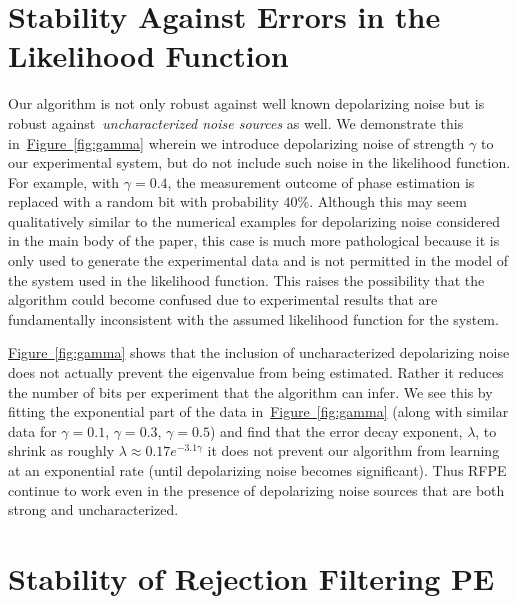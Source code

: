 \documentclass[aps,pra,amsmath,twocolumn,amssymb,superscriptaddress]{revtex4-1}
\newcommand{\fig}[1]{\hyperref[fig:#1]{Figure~\ref*{fig:#1}}}
\begin{document}
\section{Stability Against Errors in the Likelihood Function}


Our algorithm is not only robust against well known depolarizing noise but is robust against~\emph{uncharacterized noise sources} as well.  We demonstrate this in~\fig{gamma} wherein we introduce depolarizing noise of strength $\gamma$ to our experimental system, but do not include such noise in the likelihood function.  For example, with $\gamma=0.4$, the measurement outcome of phase estimation is replaced with a random bit with probability $40\%$.  Although this may seem qualitatively similar to the numerical examples for depolarizing noise considered in the main body of the paper, this case is much more pathological because it is only used to generate the experimental data and is not permitted in the model of the system used in the likelihood function.  This raises the possibility that the algorithm could become confused due to experimental results that are fundamentally inconsistent with the assumed likelihood function for the system.

\fig{gamma} shows that the inclusion of uncharacterized depolarizing noise does not actually prevent the eigenvalue from being estimated.  Rather it reduces the number of bits per experiment that the algorithm can infer.  We see this by fitting the exponential part of the data in~\fig{gamma} (along with similar data for $\gamma=0.1$, $\gamma=0.3$, $\gamma=0.5$) and find that the error decay exponent, $\lambda$, to shrink as roughly $\lambda \approx 0.17e^{-3.1\gamma}$ it does not prevent our algorithm from learning at an exponential rate (until depolarizing noise becomes significant).  Thus RFPE continue to work even in the presence of depolarizing noise sources that are both strong and uncharacterized.



\section{Stability of Rejection Filtering PE}
\label{app:stability}
\end{document}
